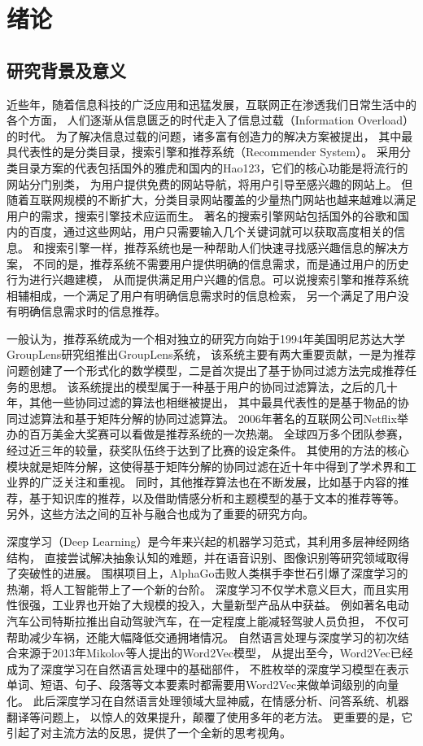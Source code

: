 \chapter{绪论}
\section{研究背景及意义}
近些年，随着信息科技的广泛应用和迅猛发展，互联网正在渗透我们日常生活中的各个方面，
人们逐渐从信息匮乏的时代走入了信息过载（Information Overload）的时代。
为了解决信息过载的问题，诸多富有创造力的解决方案被提出，
其中最具代表性的是分类目录，搜索引擎和推荐系统（Recommender System）。
采用分类目录方案的代表包括国外的雅虎和国内的Hao123，它们的核心功能是将流行的网站分门别类，
为用户提供免费的网站导航，将用户引导至感兴趣的网站上。
但随着互联网规模的不断扩大，分类目录网站覆盖的少量热门网站也越来越难以满足用户的需求，搜索引擎技术应运而生。
著名的搜索引擎网站包括国外的谷歌和国内的百度，通过这些网站，用户只需要输入几个关键词就可以获取高度相关的信息。
和搜索引擎一样，推荐系统也是一种帮助人们快速寻找感兴趣信息的解决方案，
不同的是，推荐系统不需要用户提供明确的信息需求，而是通过用户的历史行为进行兴趣建模，
从而提供满足用户兴趣的信息。可以说搜索引擎和推荐系统相辅相成，一个满足了用户有明确信息需求时的信息检索，
另一个满足了用户没有明确信息需求时的信息推荐。

一般认为，推荐系统成为一个相对独立的研究方向始于1994年美国明尼苏达大学GroupLens研究组推出GroupLens系统\parencite{resnick1994grouplens}，
该系统主要有两大重要贡献，一是为推荐问题创建了一个形式化的数学模型，二是首次提出了基于协同过滤方法完成推荐任务的思想。
该系统提出的模型属于一种基于用户的协同过滤算法，之后的几十年，其他一些协同过滤的算法也相继被提出，
其中最具代表性的是基于物品的协同过滤算法和基于矩阵分解的协同过滤算法。
2006年著名的互联网公司Netflix举办的百万美金大奖赛可以看做是推荐系统的一次热潮。
全球四万多个团队参赛，经过近三年的较量，获奖队伍终于达到了比赛的设定条件。
其使用的方法的核心模块就是矩阵分解，这使得基于矩阵分解的协同过滤在近十年中得到了学术界和工业界的广泛关注和重视。
同时，其他推荐算法也在不断发展，比如基于内容的推荐，基于知识库的推荐，以及借助情感分析和主题模型的基于文本的推荐等等。
另外，这些方法之间的互补与融合也成为了重要的研究方向。

深度学习（Deep Learning）是今年来兴起的机器学习范式，其利用多层神经网络结构，
直接尝试解决抽象认知的难题，并在语音识别、图像识别等研究领域取得了突破性的进展。
围棋项目上，AlphaGo击败人类棋手李世石引爆了深度学习的热潮，将人工智能带上了一个新的台阶。
深度学习不仅学术意义巨大，而且实用性很强，工业界也开始了大规模的投入，大量新型产品从中获益。
例如著名电动汽车公司特斯拉推出自动驾驶汽车，在一定程度上能减轻驾驶人员负担，
不仅可帮助减少车祸，还能大幅降低交通拥堵情况。
自然语言处理与深度学习的初次结合来源于2013年Mikolov等人\parencite{mikolov2013efficient}提出的Word2Vec模型，
从提出至今，Word2Vec已经成为了深度学习在自然语言处理中的基础部件，
不胜枚举的深度学习模型在表示单词、短语、句子、段落等文本要素时都需要用Word2Vec来做单词级别的向量化。
此后深度学习在自然语言处理领域大显神威，在情感分析、问答系统、机器翻译等问题上，
以惊人的效果提升，颠覆了使用多年的老方法。
更重要的是，它引起了对主流方法的反思，提供了一个全新的思考视角。

